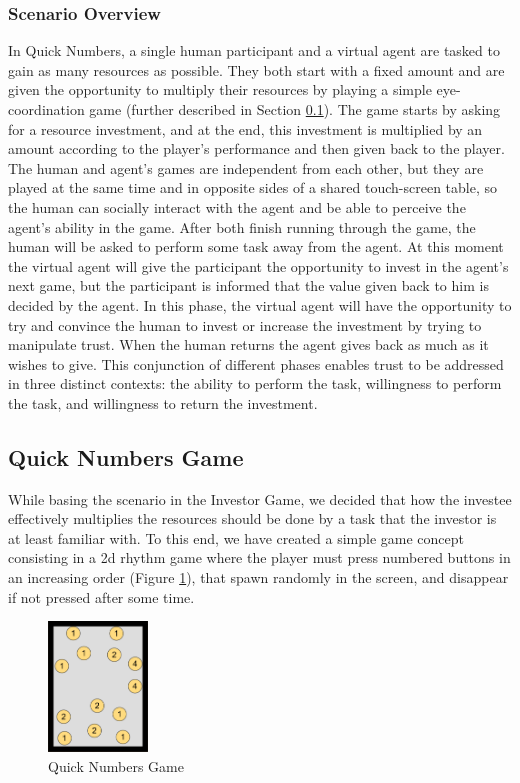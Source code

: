 \subsubsection{Scenario Overview}
\label{sub:ScenarioOverview}
In Quick Numbers, a single human participant and a virtual agent are tasked to gain as many resources as possible. They both start with a fixed amount and are given the opportunity to multiply their resources by playing a simple eye-coordination game (further described in Section \ref{sec:QuickNumbersGame}). The game starts by asking for a resource investment, and at the end, this investment is multiplied by an amount according to the player's performance and then given back to the player. The human and agent's games are independent from each other, but they are played at the same time and in opposite sides of a shared touch-screen table, so the human can socially interact with the agent and be able to perceive the agent's ability in the game. After both finish running through the game, the human will be asked to perform some task away from the agent. At this moment the virtual agent will give the participant the opportunity to invest in the agent's next game, but the participant is informed that the value given back to him is decided by the agent. In this phase, the virtual agent will have the opportunity to try and convince the human to invest or increase the investment by trying to manipulate trust. When the human returns the agent gives back as much as it wishes to give. This conjunction of different phases enables trust to be addressed in three distinct contexts: the ability to perform the task, willingness to perform the task, and willingness to return the investment. 


\subsection{Quick Numbers Game}
\label{sec:QuickNumbersGame}
While basing the scenario in the Investor Game, we decided that how the investee effectively multiplies the resources should be done by a task that the investor is at least familiar with. To this end, we have created a simple game concept consisting in a 2d rhythm game where the player must press numbered buttons in an increasing order (Figure \ref{fig:QuickNumbersGame}), that spawn randomly in the screen, and disappear if not pressed after some time.

\begin{figure}[hbt]
    \centering
    \includegraphics[width=100px]{figures/FallingBoltsDiagram.png}
    \caption{Quick Numbers Game}
    \label{fig:QuickNumbersGame}
\end{figure}

